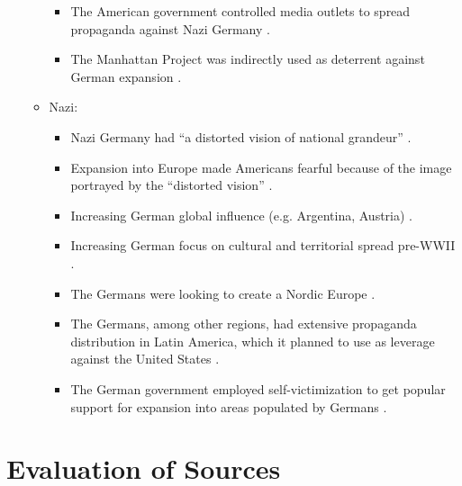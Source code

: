\documentclass[a4paper,12pt]{article}
\begin{document}
\begin{itemize}
\begin{itemize}
                \begin{itemize}
                    \item The American government controlled media outlets to spread propaganda against Nazi Germany \cite[2]{lauriec}.
                    \item The Manhattan Project was indirectly used as deterrent against German expansion \cite[140]{grovesl}.
                \end{itemize}
                \item Nazi:
                \begin{itemize}
                    \item Nazi Germany had ``a distorted vision of national grandeur'' \cite[37]{kallisa}.
                    \item Expansion into Europe made Americans fearful because of the image portrayed by the ``distorted vision'' \cite[37]{kallisa}.
                    \item Increasing German global influence (e.g. Argentina, Austria) \cite[2]{pyensonl}.
                    \item Increasing German focus on cultural and territorial spread pre-WWII \cite[17]{pyensonl}.
                    \item The Germans were looking to create a Nordic Europe \cite[192]{guettelj}.
                    \item The Germans, among other regions, had extensive propaganda distribution in Latin America, which it planned to use as leverage against the United States \cite[59]{krise}.
                    \item The German government employed self-victimization to get popular support for expansion into areas populated by Germans \cite[1]{bergend}.
                \end{itemize}
            \end{itemize}
        \end{itemize}


    \section{Evaluation of Sources} %
    
\end{document}
